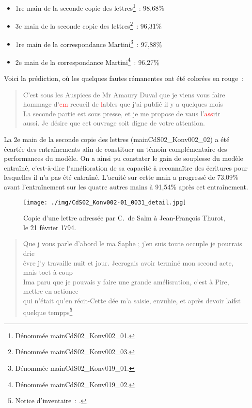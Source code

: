 \documentclass[a4paper,12pt,twoside]{book}
\begin{document}
				\begin{itemize}
					\item 1re main de la seconde copie des lettres\footnote{Dénommée \textsf{mainCdS02\_Konv002\_01}.}~: 98,68\%
					\item 3e main de la seconde copie des lettres\footnote{Dénommée \textsf{mainCdS02\_Konv002\_03}.}~: 96,31\%
					\item 1re main de la correspondance Martini\footnote{Dénommée \textsf{mainCdS02\_Konv019\_01}.}~: 97,88\%
					\item 2e main de la correspondance Martini\footnote{Dénommée \textsf{mainCdS02\_Konv019\_02}.}~: 96,27\%
				\end{itemize}
			
				Voici la prédiction, où les quelques fautes rémanentes ont été colorées en rouge~:
				
				\begin{quote}
					\textsf{C'est sous les Auspices de Mr Amaury Duval que je viens vous faire\\
					hommage d'\textcolor{red}{em} recueil de \textcolor{red}{l}ables que j'ai publié il y a quelques mois\\
					La seconde partie est sous presse, et je me propose de vaus l'\textcolor{red}{ass}rir\\
					aussi. Je désire que cet ouvrage soit digne de votre attention.}
				\end{quote}
							
				La 2e main de la seconde copie des lettres (\textsf{mainCdS02\_Konv002\_02}) a été écartée des entraînements afin de constituer un témoin complémentaire des performances du modèle. On a ainsi pu constater le gain de souplesse du modèle entraîné, c'est-à-dire l'amélioration de sa capacité à reconnaître des écritures pour lesquelles il n'a pas été entraîné. L'acuité sur cette main a progressé de 73,09\% avant l'entraînement sur les quatre autres mains à 91,54\% après cet entraînement.
				
				\begin{figure}[!h]
					\centering
					\texttt{[image: ./img/CdS02\_Konv002-01\_0031\_detail.jpg]}%
					\caption{Copie d'une lettre adressée par C.~de Salm à Jean-François Thurot, le 21 février 1794.}%
					\label{}%
				\end{figure}
				
				\begin{quote}
					\scriptsize \textsf{Que j vous parle d'abord le ma Saphe ; j'en suis toute occuple je pourrais drie\\
					êvre j'y travaille nuit et jour. Jecrogais avoir terminé mon second acte, mais toet à-coup\\
					Ima paru que je pouvais y faire une grande amélisration, c'est à Pire, mettre en actionce\\
					qui n'était qu'en récit-Cette dée m'a saisie, envuhie, et après devoir laifst quelque tempps}\footnote{Notice d'inventaire~: \cite{CdS02031032}.}
				\end{quote}
			
\end{document}
